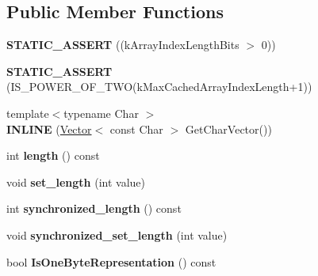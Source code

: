 \subsection*{Public Member Functions}
\begin{DoxyCompactItemize}
\item 
{\bfseries S\+T\+A\+T\+I\+C\+\_\+\+A\+S\+S\+E\+RT} ((k\+Array\+Index\+Length\+Bits $>$ 0))\hypertarget{classv8_1_1internal_1_1_string_a30bd067ab1a3a3d754545ba0b528942e}{}\label{classv8_1_1internal_1_1_string_a30bd067ab1a3a3d754545ba0b528942e}

\item 
{\bfseries S\+T\+A\+T\+I\+C\+\_\+\+A\+S\+S\+E\+RT} (I\+S\+\_\+\+P\+O\+W\+E\+R\+\_\+\+O\+F\+\_\+\+T\+WO(k\+Max\+Cached\+Array\+Index\+Length+1))\hypertarget{classv8_1_1internal_1_1_string_a5731556164819f9e52c0a5a5b48e9a98}{}\label{classv8_1_1internal_1_1_string_a5731556164819f9e52c0a5a5b48e9a98}

\item 
{\footnotesize template$<$typename Char $>$ }\\{\bfseries I\+N\+L\+I\+NE} (\hyperlink{classv8_1_1internal_1_1_vector}{Vector}$<$ const Char $>$ Get\+Char\+Vector())\hypertarget{classv8_1_1internal_1_1_string_ad5a59795ff8fd33a9caa278a9126fa7d}{}\label{classv8_1_1internal_1_1_string_ad5a59795ff8fd33a9caa278a9126fa7d}

\item 
int {\bfseries length} () const \hypertarget{classv8_1_1internal_1_1_string_afafbcf4c49212b4ded7592db4c44ca66}{}\label{classv8_1_1internal_1_1_string_afafbcf4c49212b4ded7592db4c44ca66}

\item 
void {\bfseries set\+\_\+length} (int value)\hypertarget{classv8_1_1internal_1_1_string_aea8a5dad8c9c793594ea3f94c02e6402}{}\label{classv8_1_1internal_1_1_string_aea8a5dad8c9c793594ea3f94c02e6402}

\item 
int {\bfseries synchronized\+\_\+length} () const \hypertarget{classv8_1_1internal_1_1_string_a18dd6c1f53a296eaad0b86bae64c1382}{}\label{classv8_1_1internal_1_1_string_a18dd6c1f53a296eaad0b86bae64c1382}

\item 
void {\bfseries synchronized\+\_\+set\+\_\+length} (int value)\hypertarget{classv8_1_1internal_1_1_string_a70a34e89d4553f90cb58c268c3893433}{}\label{classv8_1_1internal_1_1_string_a70a34e89d4553f90cb58c268c3893433}

\item 
bool {\bfseries Is\+One\+Byte\+Representation} () const \hypertarget{classv8_1_1internal_1_1_string_a882e550aee3e5496ea38760b60ed5c43}{}\label{classv8_1_1internal_1_1_string_a882e550aee3e5496ea38760b60ed5c43}


\end{DoxyCompactItemize}
